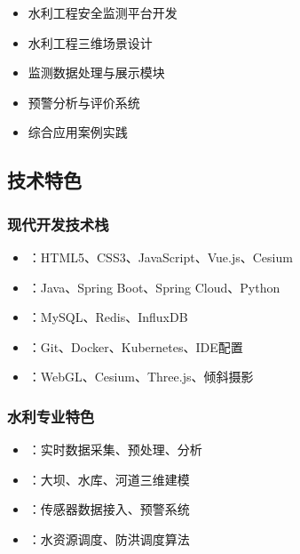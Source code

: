
\begin{itemize}
\tightlist
\item
  水利工程安全监测平台开发
\item
  水利工程三维场景设计
\item
  监测数据处理与展示模块
\item
  预警分析与评价系统
\item
  综合应用案例实践
\end{itemize}

\hypertarget{ux6280ux672fux7279ux8272-1}{%
\subsection{技术特色}\label{ux6280ux672fux7279ux8272-1}}

\hypertarget{ux73b0ux4ee3ux5f00ux53d1ux6280ux672fux6808-1}{%
\subsubsection{现代开发技术栈}\label{ux73b0ux4ee3ux5f00ux53d1ux6280ux672fux6808-1}}

\begin{itemize}
\tightlist
\item
  ：HTML5、CSS3、JavaScript、Vue.js、Cesium
\item
  ：Java、Spring Boot、Spring Cloud、Python
\item
  ：MySQL、Redis、InfluxDB
\item
  ：Git、Docker、Kubernetes、IDE配置
\item
  ：WebGL、Cesium、Three.js、倾斜摄影
\end{itemize}

\hypertarget{ux6c34ux5229ux4e13ux4e1aux7279ux8272-1}{%
\subsubsection{水利专业特色}\label{ux6c34ux5229ux4e13ux4e1aux7279ux8272-1}}

\begin{itemize}
\tightlist
\item
  ：实时数据采集、预处理、分析
\item
  ：大坝、水库、河道三维建模
\item
  ：传感器数据接入、预警系统
\item
  ：水资源调度、防洪调度算法
\end{itemize}


